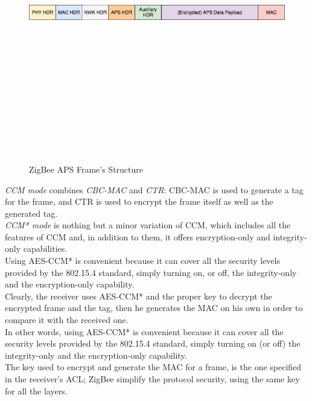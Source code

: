 \documentclass[12pt]{report}
\begin{document}
{\begin{figure}[H]
\includegraphics[width=13cm,height=13cm,keepaspectratio]{aps_frame}
\centering
\caption{ZigBee APS Frame's Structure}
\label{fig:zigbeeapsframestruc}
\end{figure}


\emph{CCM mode} combines \emph{CBC-MAC} and \emph{CTR}: CBC-MAC is used to generate a tag for the frame, and CTR is used to encrypt the frame itself as well as the generated tag.\\
\emph{CCM* mode} is nothing but a minor variation of CCM, which includes all the features of CCM and, in addition to them, it offers encryption-only and integrity-only capabilities.\\
Using AES-CCM* is convenient because it can cover all the security levels provided by the 802.15.4 standard, simply turning on, or off, the integrity-only and the encryption-only capability.\\

Clearly, the receiver uses AES-CCM* and the proper key to decrypt the encrypted frame and the tag, then he generates the MAC on his own in order to compare it with the received one.\\
In other words, using AES-CCM* is convenient because it can cover all the security levels provided by the 802.15.4 standard, simply turning on (or off) the integrity-only and the encryption-only capability.\\
The key used to encrypt and generate the MAC for a frame, is the one specified in the receiver's ACL; ZigBee simplify the protocol security, using the same key for all the layers.\\


}
\end{document}
